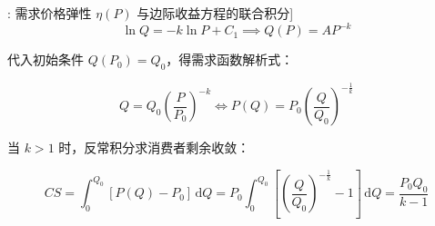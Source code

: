 \documentclass[11pt,a4paper,UTF8]{ctexart}
\begin{document}
\begin{thmbox}[模型[6]: 需求价格弹性 $\eta(P)$ 与边际收益方程的联合积分]
\begin{equation*}
\ln Q = -k \ln P + C_1 \implies Q(P) = A P^{-k}
\end{equation*}


代入初始条件 $Q(P_0) = Q_0$，得需求函数解析式：


\begin{equation*}
Q = Q_0 \left(\frac{P}{P_0}\right)^{-k} \iff P(Q) = P_0 \left(\frac{Q}{Q_0}\right)^{-\frac{1}{k}}
\end{equation*}


当 $k > 1$ 时，反常积分求消费者剩余收敛：


\begin{equation*}
CS = \int_0^{Q_0} [P(Q) - P_0]\,\mathrm{d}Q = P_0 \int_0^{Q_0} \left[\left(\frac{Q}{Q_0}\right)^{-\frac{1}{k}} - 1\right]\,\mathrm{d}Q = \frac{P_0 Q_0}{k - 1}
\end{equation*}


\end{thmbox}
\end{document}
